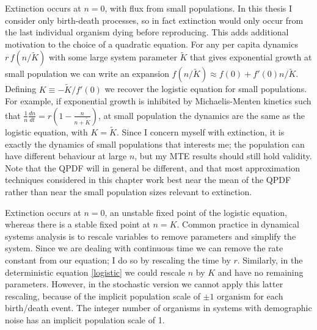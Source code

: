 Extinction occurs at $n=0$, with flux from small populations. 
In this thesis I consider only birth-death processes, so in fact extinction would only occur from the last individual organism dying before reproducing. 
This adds additional motivation to the choice of a quadratic equation. 
For any per capita dynamics $r\,f(n/\tilde{K})$ with some large system parameter $\tilde{K}$ that gives exponential growth at small population we can write an expansion $f(n/\tilde{K})\approx f(0) + f'(0)n/\tilde{K}$. 
Defining $K\equiv-\tilde{K}/f'(0)$ we recover the logistic equation for small populations. 
For example, if exponential growth is inhibited by Michaelis-Menten kinetics such that $\frac{1}{n}\frac{dn}{dt} = r\left(1-\frac{n}{n+\tilde{K}}\right)$, at small population the dynamics are the same as the logistic equation, with $K=\tilde{K}$. 
Since I concern myself with extinction, it is exactly the dynamics of small populations that interests me; the population can have different behaviour at large $n$, but my MTE results should still hold validity. 
Note that the QPDF will in general be different, and that most approximation techniques considered in this chapter work best near the mean of the QPDF rather than near the small population sizes relevant to extinction. 

Extinction occurs at $n=0$, an unstable fixed point of the logistic equation, whereas there is a stable fixed point at $n=K$. 
Common practice in dynamical systems analysis is to rescale variables to remove parameters and simplify the system. 
Since we are dealing with continuous time we can remove the rate constant from our equation; I do so by rescaling the time by $r$. 
Similarly, in the deterministic equation \ref{logistic} we could rescale $n$ by $K$ and have no remaining parameters. 
However, in the stochastic version we cannot apply this latter rescaling, because of the implicit population scale of $\pm1$ organism for each birth/death event. 
The integer number of organisms in systems with demographic noise has an implicit population scale of 1. 


